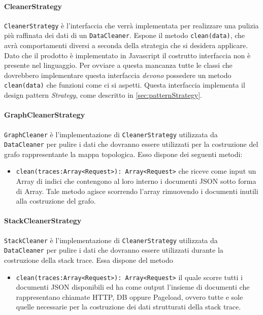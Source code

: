 \paragraph{CleanerStrategy}\Spazio
\label{sec:CleanerStrategy}
\texttt{CleanerStrategy} è l'interfaccia che verrà implementata per realizzare una pulizia più raffinata dei dati di un \texttt{DataCleaner}. Espone il metodo \texttt{clean(data)}, che avrà comportamenti diversi a seconda della strategia che si desidera applicare. Dato che il prodotto è implementato in Javascript il costrutto interfaccia non è presente nel linguaggio. Per ovviare a questa mancanza tutte le classi che dovrebbero implementare questa interfaccia \emph{devono} possedere un metodo \texttt{clean(data)} che funzioni come ci si aspetti. Questa interfaccia implementa il design pattern \emph{Strategy}, come descritto in \ref{sec:patternStrategy}.
	
	
\paragraph{GraphCleanerStrategy}\Spazio
\label{sec:GraphCleaner}
\texttt{GraphCleaner} è l'implementazione di \texttt{CleanerStrategy} utilizzata da \texttt{DataCleaner} per pulire i dati che dovranno essere utilizzati per la costruzione del grafo rappresentante la mappa topologica. Esso dispone dei seguenti metodi:
\begin{itemize}
	\item \texttt{clean(traces:Array<Request>): Array<Request>} che riceve come input un Array di indici che contengono al loro interno i documenti JSON sotto forma di Array. Tale metodo agisce scorrendo l'array rimuovendo i documenti inutili alla costruzione del grafo.
\end{itemize}

\paragraph{StackCleanerStrategy} \Spazio
\label{sec:StackCleaner}
\texttt{StackCleaner} è l'implementazione di \texttt{CleanerStrategy} utilizzata da \texttt{DataCleaner} per pulire i dati che dovranno essere utilizzati durante la costruzione della stack trace. Essa dispone del metodo
\begin{itemize}
	\item \texttt{clean(traces:Array<Request>): Array<Request>} il quale scorre tutti i documenti JSON disponibili ed ha come output l'insieme di documenti che rappresentano chiamate HTTP, DB oppure Pageload, ovvero tutte e sole quelle necessarie per la costruzione dei dati strutturati della stack trace.
\end{itemize}



